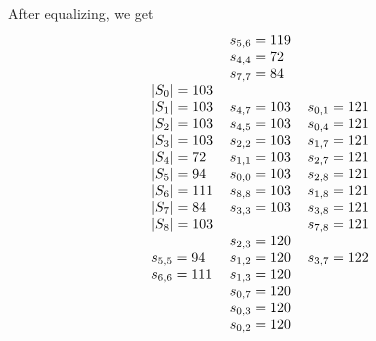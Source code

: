 \documentclass[letterpaper]{article} %
\theoremstyle{definition}
\begin{document}
After equalizing, we get 
\[
\arraycolsep=3.0pt
\begin{array}[t]{lllll}
 \begin{array}{l}
|S_0| = 103 \\
|S_1| = 103 \\
|S_2| = 103 \\
|S_3| = 103 \\
|S_4| = 72 \\
|S_5| = 94 \\
|S_6| = 111 \\
|S_7| = 84 \\
|S_8| = 103 \\
\\
s_{5, 5} = 94 \\
s_{6, 6} = 111 \\
\end{array}
 &
\begin{array}{l}
s_{5, 6} = 119 \\
s_{4, 4} = 72 \\
s_{7, 7} = 84 \\
\\
s_{4, 7} = 103 \\
s_{4, 5} = 103 \\
s_{2, 2} = 103 \\
s_{1, 1} = 103 \\
s_{0, 0} = 103 \\
s_{8, 8} = 103 \\
s_{3, 3} = 103 \\
\\
s_{2, 3} = 120 \\
s_{1, 2} = 120 \\
s_{1, 3} = 120 \\
s_{0, 7} = 120 \\
s_{0, 3} = 120 \\
s_{0, 2} = 120 \\
 \end{array}
&
  \begin{array}{l}
s_{0, 1} = 121 \\
s_{0, 4} = 121 \\
s_{1, 7} = 121 \\
s_{2, 7} = 121 \\
s_{2, 8} = 121 \\
s_{1, 8} = 121 \\
s_{3, 8} = 121 \\
s_{7, 8} = 121 \\
\\
s_{3, 7} = 122 \\

\end{array}
\end{array}\]
\end{document}
